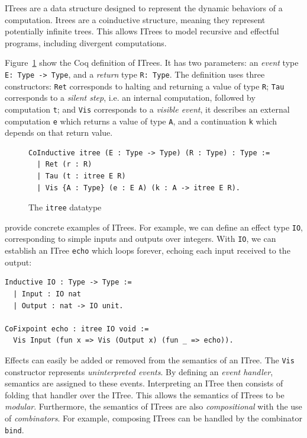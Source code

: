 \documentclass[11pt]{article}
\newcommand{\inlinecoq}[1]{\mbox{\lstinline[style=customcoq,columns=fixed,basewidth=.48em]{#1}}}
\newcommand{\ilc}[1]{\inlinecoq{#1}}
\begin{document}
ITrees are a data structure designed to represent the dynamic behaviors of a computation. Itrees are a coinductive structure, meaning they represent potentially infinite trees. This allows ITrees to model recursive and effectful programs, including divergent computations.

Figure~\ref{fig:itree} show the Coq definition of ITrees. It has two parameters: an \emph{event} type \ilc{E: Type -> Type}, and a \emph{return} type \ilc{R: Type}. The definition uses three constructors: \ilc{Ret} corresponds to halting and returning a value of type \ilc{R}; \ilc{Tau} corresponds to a \emph{silent step}, i.e. an internal computation, followed by computation \ilc{t}; and \ilc{Vis} corresponds to a \emph{visible event}, it describes an external computation \ilc{e} which returns a value of type \ilc{A}, and a continuation \ilc{k} which depends on that return value.

\begin{figure}
  \begin{lstlisting}[style=customcoq,basicstyle=\small\ttfamily]
CoInductive itree (E : Type -> Type) (R : Type) : Type :=
  | Ret (r : R)
  | Tau (t : itree E R)
  | Vis {A : Type} (e : E A) (k : A -> itree E R).
  \end{lstlisting}
  \caption{The \ilc{itree} datatype}
  \label{fig:itree}
\end{figure}

\citet{ITrees} provide concrete examples of ITrees. For example, we can define an effect type \ilc{IO}, corresponding to simple inputs and outputs over integers. With \ilc{IO}, we can establish an ITree \ilc{echo} which loops forever, echoing each input received to the output:
\begin{lstlisting}[style=customcoq,basicstyle=\small\ttfamily]
Inductive IO : Type -> Type :=
  | Input : IO nat
  | Output : nat -> IO unit.

CoFixpoint echo : itree IO void :=
  Vis Input (fun x => Vis (Output x) (fun _ => echo)).
\end{lstlisting}

Effects can easily be added or removed from the semantics of an ITree. The \ilc{Vis} constructor represents \emph{uninterpreted events}. By defining an \emph{event handler}, semantics are assigned to these events. Interpreting an ITree then consists of folding that handler over the ITree. This allows the semantics of ITrees to be \emph{modular}.
Furthermore, the semantics of ITrees are also \emph{compositional} with the use of \emph{combinators}. For example, composing ITrees can be handled by the combinator \ilc{bind}.
\end{document}

